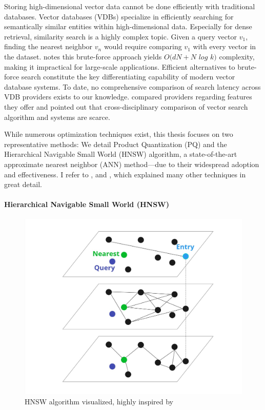 Storing high-dimensional vector data cannot be done efficiently with traditional databases. Vector databases (VDBs) specialize in efficiently searching for semantically similar entities within high-dimensional data. Especially for dense retrieval, similarity search is a highly complex topic. Given a query vector $v_1$, finding the nearest neighbor $v_{n}$ would require comparing $v_1$ with every vector in the dataset. \cite{Jing.2024} notes this brute-force approach yields $O(dN+N$ $log$ $k)$ complexity, making it impractical for large-scale applications. Efficient alternatives to brute-force search constitute the key differentiating capability of modern vector database systems. To date, no comprehensive comparison of search latency across VDB providers exists to our knowledge. \cite{Pan.2024} compared providers regarding features they offer and pointed out that cross-disciplinary comparison of vector search algorithm and systems are scarce.

While numerous optimization techniques exist, this thesis focuses on two representative methods: We detail Product Quantization (PQ) and the Hierarchical Navigable Small World (HNSW) algorithm, a state-of-the-art approximate nearest neighbor (ANN) method—due to their widespread adoption and effectiveness. I refer to \cite{Jing.2024}, and \cite{Kukreja.2023}, which explained many other techniques in great detail.

\paragraph{Hierarchical Navigable Small World (HNSW)}

\begin{figure}[h!]
    \centering
    \includegraphics[width=\textwidth]{images/HNSW.jpg}
    \caption{HNSW algorithm visualized, highly inspired by \cite{Pinecone.22.01.2025}}
    \label{fig:HNSW}
\end{figure}

